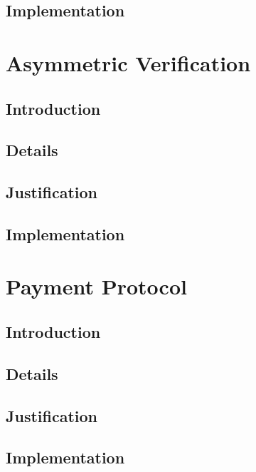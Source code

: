 \documentclass[a4paper,11pt]{article}
\begin{document}
\subsection{Implementation}

\section{Asymmetric Verification}

\subsection{Introduction}

\subsection{Details}

\subsection{Justification}

\subsection{Implementation}

\section{Payment Protocol}

\subsection{Introduction}

\subsection{Details}

\subsection{Justification}

\subsection{Implementation}
\end{document}
